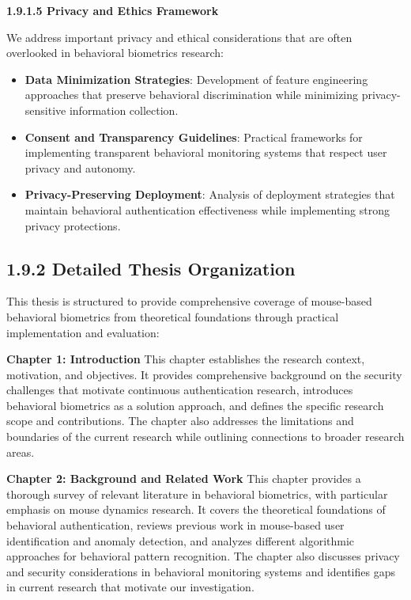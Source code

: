 \documentclass[
  12pt,
  a4paper,
]{report}
\begin{document}
\textbf{1.9.1.5 Privacy and Ethics Framework}

We address important privacy and ethical considerations that are often
overlooked in behavioral biometrics research:

\begin{itemize}
\item
  \textbf{Data Minimization Strategies}: Development of feature
  engineering approaches that preserve behavioral discrimination while
  minimizing privacy-sensitive information collection.
\item
  \textbf{Consent and Transparency Guidelines}: Practical frameworks for
  implementing transparent behavioral monitoring systems that respect
  user privacy and autonomy.
\item
  \textbf{Privacy-Preserving Deployment}: Analysis of deployment
  strategies that maintain behavioral authentication effectiveness while
  implementing strong privacy protections.
\end{itemize}

\subsection{1.9.2 Detailed Thesis
Organization}\label{detailed-thesis-organization}

This thesis is structured to provide comprehensive coverage of
mouse-based behavioral biometrics from theoretical foundations through
practical implementation and evaluation:

\textbf{Chapter 1: Introduction} This chapter establishes the research
context, motivation, and objectives. It provides comprehensive
background on the security challenges that motivate continuous
authentication research, introduces behavioral biometrics as a solution
approach, and defines the specific research scope and contributions. The
chapter also addresses the limitations and boundaries of the current
research while outlining connections to broader research areas.

\textbf{Chapter 2: Background and Related Work} This chapter provides a
thorough survey of relevant literature in behavioral biometrics, with
particular emphasis on mouse dynamics research. It covers the
theoretical foundations of behavioral authentication, reviews previous
work in mouse-based user identification and anomaly detection, and
analyzes different algorithmic approaches for behavioral pattern
recognition. The chapter also discusses privacy and security
considerations in behavioral monitoring systems and identifies gaps in
current research that motivate our investigation.
\end{document}
